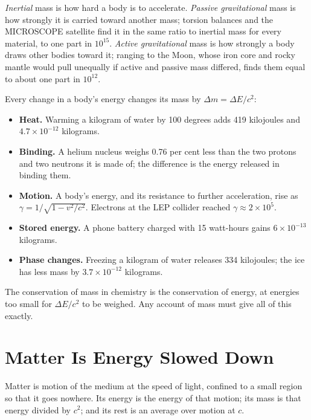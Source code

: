 \documentclass[11pt,a4paper]{article}
\begin{document}
 \emph{Inertial} mass is how hard a body is to accelerate. \emph{Passive gravitational} mass is how strongly it is carried toward another mass; torsion balances and the MICROSCOPE satellite find it in the same ratio to inertial mass for every material, to one part in $10^{15}$. \emph{Active gravitational} mass is how strongly a body draws other bodies toward it; ranging to the Moon, whose iron core and rocky mantle would pull unequally if active and passive mass differed, finds them equal to about one part in $10^{12}$.

 Every change in a body's energy changes its mass by $\Delta m = \Delta E/c^2$:
\begin{itemize}
\item \textbf{Heat.} Warming a kilogram of water by 100 degrees adds 419 kilojoules and $4.7\times10^{-12}$ kilograms.
\item \textbf{Binding.} A helium nucleus weighs 0.76 per cent less than the two protons and two neutrons it is made of; the difference is the energy released in binding them.
\item \textbf{Motion.} A body's energy, and its resistance to further acceleration, rise as $\gamma = 1/\sqrt{1-v^2/c^2}$. Electrons at the LEP collider reached $\gamma \approx 2\times10^5$.
\item \textbf{Stored energy.} A phone battery charged with 15 watt-hours gains $6\times10^{-13}$ kilograms.
\item \textbf{Phase changes.} Freezing a kilogram of water releases 334 kilojoules; the ice has less mass by $3.7\times10^{-12}$ kilograms.
\end{itemize}
The conservation of mass in chemistry is the conservation of energy, at energies too small for $\Delta E/c^2$ to be weighed. Any account of mass must give all of this exactly.

\section{Matter Is Energy Slowed Down}
\label{sec:slowed}

\begin{hypbar}
Matter is motion of the medium at the speed of light, confined to a small region so that it goes nowhere. Its energy is the energy of that motion; its mass is that energy divided by $c^2$; and its rest is an average over motion at $c$.
\end{hypbar}
\end{document}
